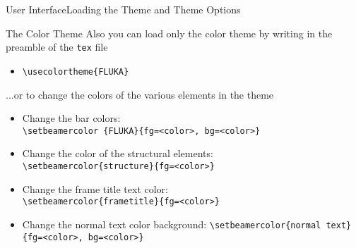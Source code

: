 \documentclass[10pt]{beamer}
\begin{document}
\begin{frame}{User Interface}{Loading the Theme and Theme Options}

  \begin{block}{The Color Theme}
    Also you can load only the color theme by writing in the preamble of the {\tt tex} file

    \vspace{5pt}

    \begin{itemize}
    \item {\tt \textbackslash usecolortheme\{FLUKA\}}
    \end{itemize}

    \vspace{5pt}

    ...or to change the colors of the various elements in the theme

    \vspace{5pt}
    \begin{itemize}
    \item Change the bar colors: \\
    {\tt \textbackslash setbeamercolor \{FLUKA\}\{fg=<color>, bg=<color>\}}

    \vspace{2pt}

    \item Change the color of the structural elements: \\
    {\tt \textbackslash setbeamercolor\{structure\}\{fg=<color>\}}

    \vspace{2pt}

    \item Change the frame title text color:\\
    {\tt \textbackslash setbeamercolor\{frametitle\}\{fg=<color>\}}

    \vspace{2pt}

    \item Change the normal text color background:
    {\tt \textbackslash setbeamercolor\{normal text\}\{fg=<color>, bg=<color>\}}
    \end{itemize}
  \end{block}
\end{frame}


\end{document}
